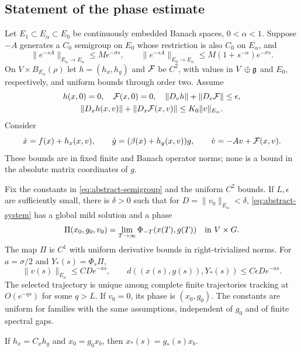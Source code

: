 \subsection{Statement of the phase estimate}
Let $E_1\subset E_\alpha\subset E_0$ be continuously embedded
Banach spaces, $0<\alpha<1$. Suppose $-A$ generates a
$C_0$ semigroup on $E_0$ whose restriction is also $C_0$
on $E_\alpha$, and
\begin{equation}\label{eq:abstract-semigroup}
 \|e^{-sA}\|_{E_\alpha\to E_\alpha}\le Me^{-\sigma s},
 \qquad
 \|e^{-sA}\|_{E_0\to E_\alpha}
       \le M(1+s^{-\alpha})e^{-\sigma s}.
\end{equation}
On $V\times B_{E_\alpha}(\rho)$ let
$h=(h_x,h_g)$ and $\mathcal F$ be $C^2$, with values in
$V\oplus\mathfrak g$ and $E_0$, respectively, and uniform bounds
through order two. Assume
\begin{equation}\label{eq:perturbation-assumptions}
 \begin{gathered}
 h(x,0)=0,\quad \mathcal F(x,0)=0,\quad
 \|D_vh\|+\|D_v\mathcal F\|\le\epsilon,\\
 \|D_xh(x,v)\|+\|D_x\mathcal F(x,v)\|
                      \le K_0\|v\|_{E_\alpha}.
 \end{gathered}
\end{equation}
Consider
\begin{equation}\label{eq:abstract-system}
 \dot x=f(x)+h_x(x,v),\qquad
 \dot g=(\beta(x)+h_g(x,v))g,\qquad
 \dot v=-Av+\mathcal F(x,v).
\end{equation}
These bounds are in fixed finite and Banach operator norms;
none is a bound in the absolute matrix coordinates of $g$.

\begin{proposition}\label{prop:phase}
Fix the constants in \eqref{eq:abstract-semigroup} and the
uniform $C^2$ bounds. If $L,\epsilon$ are sufficiently small,
there is $\delta>0$ such that for
$D=\|v_0\|_{E_\alpha}<\delta$, \eqref{eq:abstract-system}
has a global mild solution and a phase
\begin{equation}\label{eq:phase-limit}
 \Pi(x_0,g_0,v_0)
        =\lim_{T\to\infty}\Phi_{-T}(x(T),g(T))
          \quad\hbox{in } V\times G.
\end{equation}
The map $\Pi$ is $C^1$ with uniform derivative bounds in
right-trivialized norms. For $a=\sigma/2$ and
$Y_*(s)=\Phi_s\Pi$,
\begin{equation}\label{eq:abstract-tracking}
 \|v(s)\|_{E_\alpha}\le CD e^{-as},\qquad
 d((x(s),g(s)),Y_*(s))\le C\epsilon D e^{-as}.
\end{equation}
The selected trajectory is unique among complete finite
trajectories tracking at $O(e^{-qs})$ for some $q>L$.
If $v_0=0$, its phase is $(x_0,g_0)$.
The constants are uniform for families with the same assumptions,
independent of $g_0$ and of finite spectral gaps.

If $h_x=C_xh_g$ and $x_0=g_0x_b$, then
$x_*(s)=g_*(s)x_b$.
\end{proposition}

